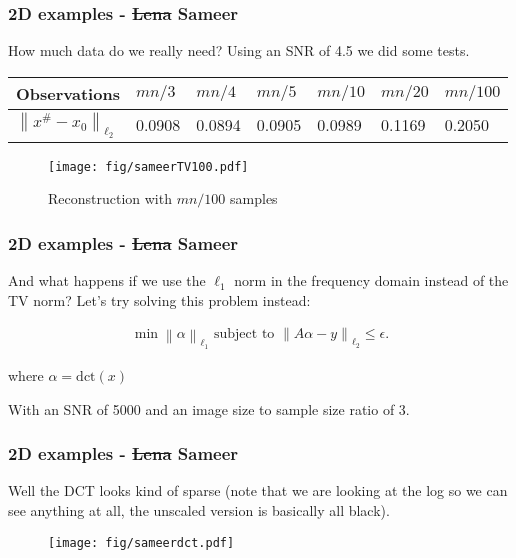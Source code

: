 \documentclass[mathserif,18pt,xcolor=table]{beamer}
\newcommand{\norm}[1]{\left\lVert #1 \right\rVert}
\begin{document}
\begin{frame}[t]
	\frametitle{2D examples - \st{Lena} Sameer}

How much data do we really need? Using an SNR of 4.5 we did some tests.
\pause

\begin{table}[h]
\begin{tabular}{l|l|l|l|l|l|l}
Observations                 & $mn/3$ & $mn/4$ & $mn/5$ & $mn/10$ & $mn/20$ & $mn/100$ \\ \hline
$\norm{x^\# - x_0}_{\ell_2}$ & 0.0908 & 0.0894 & 0.0905 & 0.0989  & 0.1169  & 0.2050   \\
\end{tabular}
\end{table}
\pause

\begin{figure}
\centering
\texttt{[image: fig/sameerTV100.pdf]}
\caption{Reconstruction with $mn/100$ samples}
\end{figure}

\end{frame}


\begin{frame}[t]
	\frametitle{2D examples - \st{Lena} Sameer}

And what happens if we use the $\ell_1$ norm in the frequency domain instead of the TV norm? Let's try solving this problem instead:

\begin{align*}
	\min \norm{\alpha}_{\ell_1} \text{ subject to } \norm{A\alpha - y}_{\ell_2} \leq \epsilon.
\end{align*}

where $\alpha = \text{dct}(x)$

With an SNR of 5000 and an image size to sample size ratio of 3.



\end{frame}

\begin{frame}[t]
	\frametitle{2D examples - \st{Lena} Sameer}

Well the DCT looks kind of sparse (note that we are looking at the log so we can see anything at all, the unscaled version is basically all black).

\begin{figure}
\centering
\texttt{[image: fig/sameerdct.pdf]}
\end{figure}

\end{frame}
\end{document}
